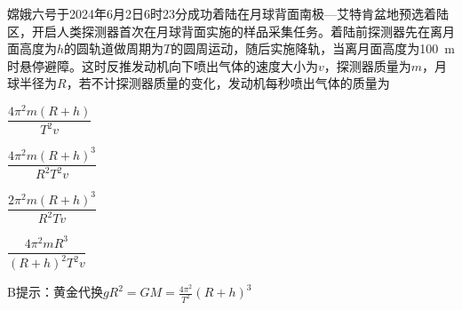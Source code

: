 嫦娥六号于2024年6月2日6时23分成功着陆在月球背面南极—艾特肯盆地预选着陆区，开启人类探测器首次在月球背面实施的样品采集任务。着陆前探测器先在离月面高度为\(h\)的圆轨道做周期为\(T\)的圆周运动，随后实施降轨，当离月面高度为\qty{100}{m}时悬停避障。这时反推发动机向下喷出气体的速度大小为\(v\)，探测器质量为\(m\)，月球半径为\(R\)，若不计探测器质量的变化，发动机每秒喷出气体的质量为\paren[]
\begin{choices}
	\item\(\dfrac{4\pi^2m(R + h)}{T^2v}\)
	\item\(\dfrac{4\pi^2m(R + h)^3}{R^2T^2v}\)
	\item\(\dfrac{2\pi^2m(R + h)^3}{R^2Tv}\)
	\item\(\dfrac{4\pi^2mR^3}{(R + h)^2T^2v}\)
\end{choices}
\begin{answer}
    B\qquad 提示：黄金代换\(gR^2 = GM = \frac{4\pi^2}{T^2}(R + h)^3\)
\end{answer}